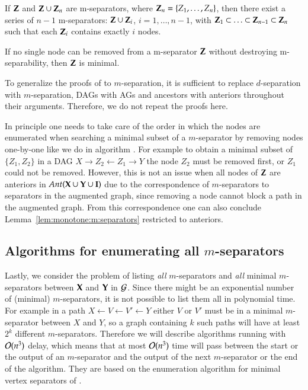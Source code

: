 \begin{corollary}
If ${\bf Z}$ and ${\bf Z} \cup {\bf Z}_n$ are m-separators, where ${\bf Z}_n = \{Z_1, \ldots, Z_n\}$, then there exist a series of $n-1$ m-separators: ${\bf Z} \cup {\bf Z}_i$, $i=1,\ldots,n-1$, with
${\bf Z}_1 \subset \ldots \subset {\bf Z}_{n-1} \subset {\bf Z}_n $
such that each ${\bf Z}_i$ contains exactly $i$ nodes.
\end{corollary}


\begin{corollary}\label{cor:monotonicity:sep}
If no single node can be removed from a m-separator ${\bf Z}$ without destroying m-separability, then ${\bf Z}$ is minimal.
\end{corollary}
 
To generalize the proofs of \cite{TianPP1998} to $m$-separation, 
%
it is sufficient to replace $d$-separation with $m$-separation, DAGs with AGs and ancestors with anteriors throughout their arguments. Therefore, we do not repeat the proofs here. %
 
In principle one needs to take care of the order in which the nodes are enumerated when searching a minimal subset of a $m$-separator by removing nodes one-by-one like we do in algorithm . For example to obtain a minimal subset of $\{Z_1, Z_2\}$ in a DAG $X \to Z_2 \gets Z_1 \to Y$ the node $Z_2$ must be removed first, or $Z_1$ could not be removed. However, this is not an issue when all nodes of ${\bf Z}$ are anteriors in $\textit{Ant}({\bf X}\cup{\bf Y}\cup{\bf I})$ due to the correspondence of $m$-separators to separators in the augmented graph, since removing a node cannot block a path in the augmented graph. From this correspondence one can also conclude Lemma~\ref{lem:monotone:m:separators} restricted to anteriors.
%
%
%
%
%
%
%
%
%


\subsection{Algorithms for enumerating all $m$-separators}\label{sec:algo:enum}


Lastly, we consider the problem of listing 
\emph{all} $m$-separators and \emph{all}  minimal $m$-separators between ${\bf X}$ and ${\bf Y}$ in ${\cal G}$. 
Since there might be an exponential number of (minimal) $m$-separators, it is not possible to list them all in polynomial time. For example in a path $X \gets V \gets V' \gets Y$ either $V$ or $V'$ must be in a minimal $m$-separator between $X$ and $Y$, so a graph containing $k$ such paths will have at least $2^k$ different $m$-separators. Therefore we will describe algorithms running with  ${\cal O}(n^3)$ delay, which means that at most ${\cal O}(n^3)$ time will pass between the start or the output of an $m$-separator and the output of the next $m$-separator or the end of the algorithm. They are based on the enumeration algorithm for minimal vertex separators of \citep{Takata2010}. 
%
%
%
%
%


